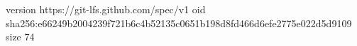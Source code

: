 version https://git-lfs.github.com/spec/v1
oid sha256:e66249b2004239f721b6c4b52135c0651b198d8fd466d6efe2775e022d5d9109
size 74
